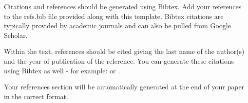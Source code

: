 \documentclass[10pt, fleqn]{article}
\begin{document}
Citations and references should be generated using Bibtex.  Add your references to the refs.bib file provided along with this template.  Bibtex citations are typically provided by academic journals and can also be pulled from Google Scholar.  

Within the text, references should be cited giving the last name of the author(s) and the year of publication of the reference. You can generate these citations using Bibtex as well - for example:  or \cite{allen1974vanishing}. 

Your references section will be automatically generated at the end of your paper in the correct format.


\nocite{*}

\end{document}
